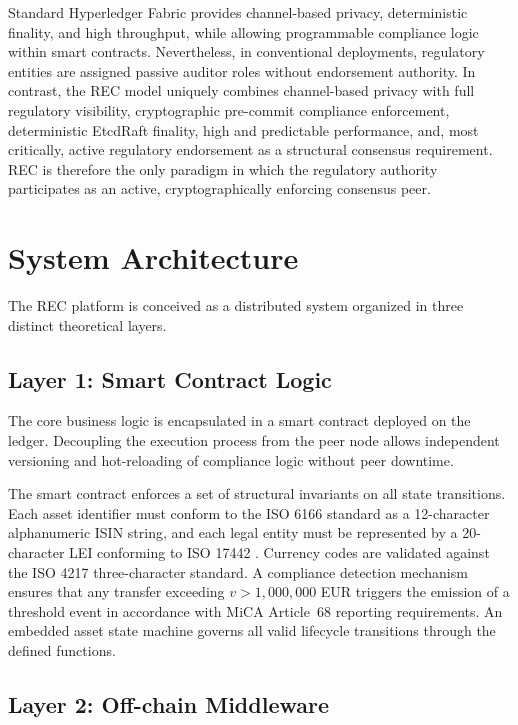 \documentclass[journal,10pt,twocolumn]{IEEEtran}
\begin{document}
Standard Hyperledger Fabric provides channel-based privacy, deterministic finality, and high throughput, while allowing programmable compliance logic within smart contracts. Nevertheless, in conventional deployments, regulatory entities are assigned passive auditor roles without endorsement authority. In contrast, the REC model uniquely combines channel-based privacy with full regulatory visibility, cryptographic pre-commit compliance enforcement, deterministic EtcdRaft finality, high and predictable performance, and, most critically, active regulatory endorsement as a structural consensus requirement. REC is therefore the only paradigm in which the regulatory authority participates as an active, cryptographically enforcing consensus peer.

\section{System Architecture}
\label{sec:arch}

The REC platform is conceived as a distributed system organized in three distinct theoretical layers.

\subsection{Layer 1: Smart Contract Logic}

The core business logic is encapsulated in a smart contract deployed on the ledger. Decoupling the execution process from the peer node allows independent versioning and hot-reloading of compliance logic without peer downtime.

The smart contract enforces a set of structural invariants on all state transitions. Each asset identifier must conform to the ISO 6166 standard \cite{ref:iso6166} as a 12-character alphanumeric ISIN string, and each legal entity must be represented by a 20-character LEI conforming to ISO 17442 \cite{ref:iso17442}. Currency codes are validated against the ISO 4217 three-character standard. A compliance detection mechanism ensures that any transfer exceeding $v > 1{,}000{,}000$ EUR triggers the emission of a threshold event in accordance with MiCA Article~68 reporting requirements. An embedded asset state machine governs all valid lifecycle transitions through the defined functions.

\subsection{Layer 2: Off-chain Middleware}
\end{document}
